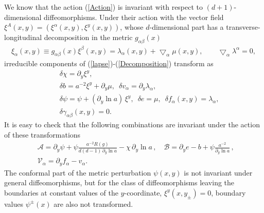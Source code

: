 \documentclass[a4paper,12pt]{article}
\newcommand{\za}{{\alpha}}   %
\newcommand{\zb}{{\beta}}    %
\newcommand{\ddim}{{d}}
\newcommand{\ddy}{{\partial_y}}
\newcommand{\bnabla}{\bigtriangledown}  %
\begin{document}
We know that the action (\ref{Action}) is invariant with respect
to $(d+1)$-dimensional diffeomorphisms.  Under their action with
the vector field $\xi^A(x,y)=(\xi^\alpha(x,y),\xi^y(x,y))$, whose
$d$-dimensional part has a transverse-longitudinal decomposition
in the metric $g_{\alpha\beta}(x)$
    \begin{eqnarray}
    \xi_\za(x,y)\equiv g_{\za\zb}(x)\xi^\zb(x,y)
    =\lambda_\za(x,y)+\bnabla_\za\mu(x,y),\qquad
    \bnabla_\za\lambda^\za=0,
    \end{eqnarray}
irreducible components of (\ref{lapse})-(\ref{Decomposition})
transform as
    \begin{eqnarray}
    &&\delta\chi=\ddy\xi^y, \\
    &&\delta b=a^{-2}\xi^y +\ddy \mu,\,\,\,
    \delta v_\alpha=\ddy \lambda_\za,\\
    &&\delta\psi=\psi+(\ddy \ln{a})\,\xi^y,
    \,\,\,\delta e=\mu,\,\,\,
    \delta f_\alpha(x,y)=\lambda_\za,\\
    &&\delta\gamma_{\za\zb}(x,y)=0.
    \end{eqnarray}
It is easy to check that the following combinations are invariant
under the action of these transformations \cite{HHR}
\newcommand{\A}{\mathcal{A}}
\newcommand{\B}{\mathcal{B}}
\newcommand{\V}{\mathcal{V}}
    \begin{eqnarray}
    &&\A=\ddy\psi+\psi\frac{a^{-2}R(g)}
    {\ddim(\ddim\!-\!1)\,\ddy\!\ln{a}}
    -\chi\,\ddy\ln{a}\,,\quad
    \B=\ddy e-b+\psi\frac{a^{-2}}
    {\ddy\ln{a}}\,,\quad          \nonumber\\
    &&\V_\za=\ddy f_\za-v_\za.   \label{invariants}
    \end{eqnarray}
The conformal part of the metric perturbation $\psi(x,y)$ is not
invariant under general diffeomorphisms, but for the class of
diffeomorphisms leaving the boundaries at constant values of the
$y$-coordinate, $\xi^y(x,y_\pm)=0$, boundary values $\psi^\pm(x)$
are also not transformed.
\end{document}

